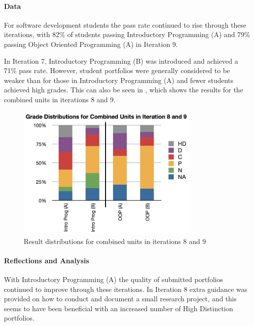
\paragraph{Data} %

For software development students the pass rate continued to rise through these iterations, with 82\% of students passing Introductory Programming (A) and 79\% passing Object Oriented Programming (A) in Iteration 9.

In Iteration 7, Introductory Programming (B) was introduced and achieved a 71\% pass rate. However, student portfolios were generally considered to be weaker than for those in Introductory Programming (A) and fewer students achieved high grades. This can also be seen in , which shows the results for the combined units in iterations 8 and 9.

\begin{figure}[htbp]
  \centering
  \includegraphics[width=0.8\textwidth]{CombinedUnits}
  \caption{Result distributions for combined units in iterations 8 and 9}
  \label{fig:combined}
\end{figure}

\paragraph{Reflections and Analysis} %

With Introductory Programming (A) the quality of submitted portfolios continued to improve through these iterations. In Iteration 8 extra guidance was provided on how to conduct and document a small research project, and this seems to have been beneficial with an increased number of High Distinction portfolios.

